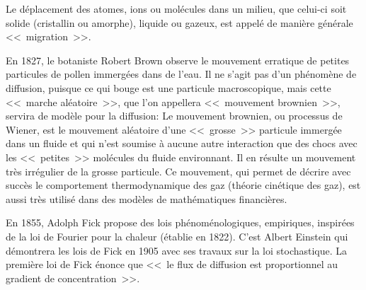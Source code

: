 \medskip
\begin{histoire}%
Le déplacement des atomes, ions ou molécules dans un milieu, que celui-ci soit solide (cristallin ou amorphe), 
liquide ou gazeux, est appelé de manière générale <<~migration~>>. 

\medskip
{}

\medskip
En 1827, le botaniste Robert Brown 
observe le mouvement erratique de petites particules de pollen 
immergées dans de l'eau. Il ne s'agit pas d'un phénomène de diffusion, puisque ce qui bouge est 
une particule macroscopique, mais cette <<~marche aléatoire~>>, que l'on appellera <<~mouvement 
brownien~>>, servira de modèle pour la diffusion:
Le mouvement brownien, ou processus de Wiener, 
est le mouvement aléatoire d'une <<~grosse~>> particule immergée dans un fluide et qui n'est soumise 
à aucune autre interaction que des chocs avec les <<~petites~>> molécules du fluide environnant. 
Il en résulte un mouvement très irrégulier de la grosse particule.
Ce mouvement, qui permet de décrire avec succès le comportement thermodynamique des gaz 
(théorie cinétique des gaz), est aussi très utilisé dans des modèles de mathématiques financières.

\medskip
En 1855, Adolph Fick 
propose des lois phénoménologiques, empiriques, inspirées de la loi de 
Fourier 
pour la chaleur (établie en 1822). 
C'est Albert Einstein 
qui démontrera les lois de Fick 
en 1905 avec ses travaux sur la loi stochastique. 
La première loi de Fick énonce que <<~le flux de diffusion est proportionnel au gradient de 
concentration~>>.
\end{histoire}

